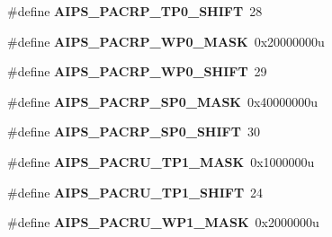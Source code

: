 \begin{DoxyCompactItemize}
\item 
\#define {\bfseries A\+I\+P\+S\+\_\+\+P\+A\+C\+R\+P\+\_\+\+T\+P0\+\_\+\+S\+H\+I\+FT}~28\hypertarget{group__AIPS__Register__Masks_gab7fea023f2746f87bebf27a1312ffb93}{}\label{group__AIPS__Register__Masks_gab7fea023f2746f87bebf27a1312ffb93}

\item 
\#define {\bfseries A\+I\+P\+S\+\_\+\+P\+A\+C\+R\+P\+\_\+\+W\+P0\+\_\+\+M\+A\+SK}~0x20000000u\hypertarget{group__AIPS__Register__Masks_ga15c748d4323aac6208af46708fda04e2}{}\label{group__AIPS__Register__Masks_ga15c748d4323aac6208af46708fda04e2}

\item 
\#define {\bfseries A\+I\+P\+S\+\_\+\+P\+A\+C\+R\+P\+\_\+\+W\+P0\+\_\+\+S\+H\+I\+FT}~29\hypertarget{group__AIPS__Register__Masks_ga3c468139bdd369cd7d3a4c12f0fac6cd}{}\label{group__AIPS__Register__Masks_ga3c468139bdd369cd7d3a4c12f0fac6cd}

\item 
\#define {\bfseries A\+I\+P\+S\+\_\+\+P\+A\+C\+R\+P\+\_\+\+S\+P0\+\_\+\+M\+A\+SK}~0x40000000u\hypertarget{group__AIPS__Register__Masks_gabb3f22e5206c6f209190a7d8e9c2ce19}{}\label{group__AIPS__Register__Masks_gabb3f22e5206c6f209190a7d8e9c2ce19}

\item 
\#define {\bfseries A\+I\+P\+S\+\_\+\+P\+A\+C\+R\+P\+\_\+\+S\+P0\+\_\+\+S\+H\+I\+FT}~30\hypertarget{group__AIPS__Register__Masks_ga65473ffce7621c988b3092e426359c51}{}\label{group__AIPS__Register__Masks_ga65473ffce7621c988b3092e426359c51}

\item 
\#define {\bfseries A\+I\+P\+S\+\_\+\+P\+A\+C\+R\+U\+\_\+\+T\+P1\+\_\+\+M\+A\+SK}~0x1000000u\hypertarget{group__AIPS__Register__Masks_ga6052919cda7ef8c050085795d2a69010}{}\label{group__AIPS__Register__Masks_ga6052919cda7ef8c050085795d2a69010}

\item 
\#define {\bfseries A\+I\+P\+S\+\_\+\+P\+A\+C\+R\+U\+\_\+\+T\+P1\+\_\+\+S\+H\+I\+FT}~24\hypertarget{group__AIPS__Register__Masks_ga9424fffa6e118b4ab5495370f3e790b0}{}\label{group__AIPS__Register__Masks_ga9424fffa6e118b4ab5495370f3e790b0}

\item 
\#define {\bfseries A\+I\+P\+S\+\_\+\+P\+A\+C\+R\+U\+\_\+\+W\+P1\+\_\+\+M\+A\+SK}~0x2000000u\hypertarget{group__AIPS__Register__Masks_ga253204e4f114ac4fdc7d0d1a3889c05b}{}\label{group__AIPS__Register__Masks_ga253204e4f114ac4fdc7d0d1a3889c05b}


\end{DoxyCompactItemize}
